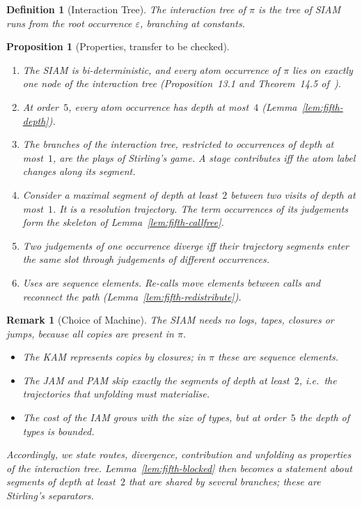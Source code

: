 \documentclass[10pt,a4paper]{article}
\theoremstyle{plain}%
\newtheorem{definition}[theorem]{Definition}
\newtheorem{proposition}[theorem]{Proposition}
\newtheorem{remark}[theorem]{Remark}
\begin{document}
\begin{definition}[Interaction Tree]
The \emph{interaction tree} of $\pi$ is the tree of SIAM runs from the root occurrence $\varepsilon$, branching at constants.
\end{definition}

\begin{proposition}[Properties, transfer to be checked]\label{prop:fifth-siam}
\leavevmode
\begin{enumerate}
\item The SIAM is bi-deterministic, and every atom occurrence of $\pi$ lies on exactly one node of the interaction tree (Proposition~13.1 and Theorem~14.5 of~\cite{AccattoliDLV21}).
\item At order~$5$, every atom occurrence has depth at most~$4$ (Lemma~\ref{lem:fifth-depth}).
\item The branches of the interaction tree, restricted to occurrences of depth at most~$1$, are the plays of Stirling's game.
A stage contributes iff the atom label changes along its segment.
\item Consider a maximal segment of depth at least~$2$ between two visits of depth at most~$1$.
It is a resolution trajectory.
The term occurrences of its judgements form the skeleton of Lemma~\ref{lem:fifth-callfree}.
\item Two judgements of one occurrence diverge iff their trajectory segments enter the same slot through judgements of different occurrences.
\item Uses are sequence elements.
Re-calls move elements between calls and reconnect the path (Lemma~\ref{lem:fifth-redistribute}).
\end{enumerate}
\end{proposition}

\begin{remark}[Choice of Machine]
The SIAM needs no logs, tapes, closures or jumps, because all copies are present in $\pi$.
\begin{itemize}
\item The KAM represents copies by closures; in $\pi$ these are sequence elements.
\item The JAM and PAM skip exactly the segments of depth at least~$2$, i.e.\ the trajectories that unfolding must materialise.
\item The cost of the IAM grows with the size of types, but at order~$5$ the depth of types is bounded.
\end{itemize}
Accordingly, we state routes, divergence, contribution and unfolding as properties of the interaction tree.
Lemma~\ref{lem:fifth-blocked} then becomes a statement about segments of depth at least~$2$ that are shared by several branches; these are Stirling's separators.
\end{remark}
\end{document}
